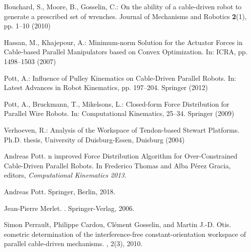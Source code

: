 \documentclass[11pt,a4paper,onepage,openany]{book}
\begin{document}
\begin{thebibliography}{10}
 Bouchard, S., Moore, B., Gosselin, C.: {O}n the
    ability of a cable-driven robot to generate a prescribed set of wrenches.
\newblock Journal of Mechanisms and Robotics \textbf{2}(1), pp. 1--10 (2010)

 Hassan, M., Khajepour, A.: {M}inimum-norm {S}olution for
    the {A}ctuator
  {F}orces in {C}able-based {P}arallel {M}anipulators based on {C}onvex
  {O}ptimization.
\newblock In: ICRA, pp. 1498--1503 (2007)

 Pott, A.: {I}nfluence of {P}ulley {K}inematics on
    {C}able-{D}riven {P}arallel {R}obots.
\newblock In: {L}atest {A}dvances in
  {R}obot {K}inematics, pp. 197--204. Springer (2012)

 Pott, A., Bruckmann, T., Mikelsons, L.: {C}losed-form
    {F}orce {D}istribution for {P}arallel {W}ire {R}obots.
\newblock In: {C}omputational {K}inematics, 25--34. Springer (2009)

 Verhoeven, R.: {A}nalysis of the {W}orkspace of
    {T}endon-based {S}tewart {P}latforms.
\newblock Ph.D. thesis, {University of Duisburg-Essen}, Duisburg (2004)

 Andreas Pott.
n improved {F}orce {D}istribution {A}lgorithm for
  {O}ver-{C}onstrained {C}able-{D}riven {P}arallel {R}obots.
\newblock In {Frederico Thomas} and {Alba P{\'e}rez Gracia}, editors, {\em
  {C}omputational {K}inematics 2013}.

 Andreas Pott.
\newblock Springer, Berlin, 2018.

 Jean-Pierre Merlet.
.
\newblock Springer-Verlag, 2006.

 Simon Perrault, Philippe Cardou, Cl{\'e}ment Gosselin,
    and Martin J.-D. Otis.
eometric determination of the interference-free
  constant-orientation workspace of parallel cable-driven mechanisms.
, 2(3), 2010.

\end{thebibliography}
\end{document}
